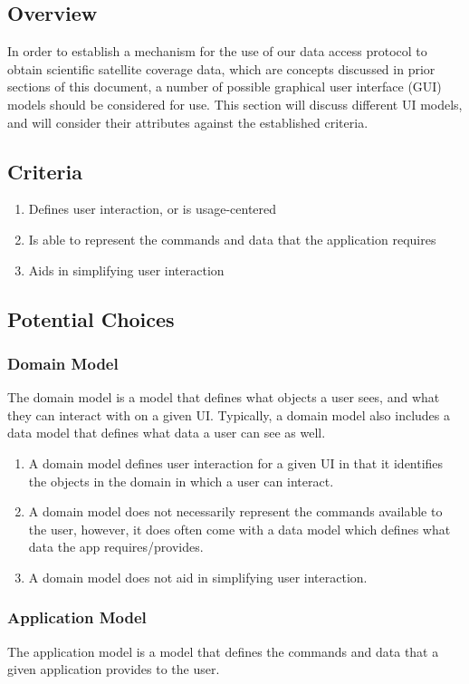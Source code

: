 \documentclass[onecolumn, draftclsnofoot,10pt, compsoc]{IEEEtran}
\begin{document}
\subsection{Overview}
In order to establish a mechanism for the use of our data access protocol to obtain scientific satellite coverage data, which are concepts discussed in prior sections of this document, a number of possible graphical user interface (GUI) models should be considered for use. This section will discuss different UI models, and will consider their attributes against the established criteria.
\subsection{Criteria}
\begin{enumerate}
\item Defines user interaction, or is usage-centered
\item Is able to represent the commands and data that the application requires
\item Aids in simplifying user interaction
\end{enumerate}

\subsection{Potential Choices}

\subsubsection{Domain Model}
The domain model is a model that defines what objects a user sees, and what they can interact with on a given UI. Typically, a domain model also includes a data model that defines what data a user can see as well.

\begin{enumerate}
\item A domain model defines user interaction for a given UI in that it identifies the objects in the domain in which a user can interact.
\item A domain model does not necessarily represent the commands available to the user, however, it does often come with a data model which defines what data the app requires/provides.
\item A domain model does not aid in simplifying user interaction.
\end{enumerate}

\subsubsection{Application Model}
The application model is a model that defines the commands and data that a given application provides to the user.
\end{document}
